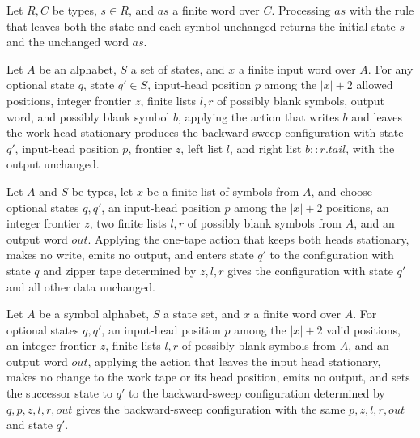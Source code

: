 \begin{lemma}
\label{Turing.FinTM.sweepFold_id}
\leanok
{}
Let $R,C$ be types, $s\in R$, and $as$ a finite word over $C$. Processing $as$ with the
rule that leaves both the state and each symbol unchanged returns the initial state $s$
and the unchanged word $as$.
\end{lemma}

\begin{lemma}
\label{Turing.FinTM.sweepRevCfg_write}
\leanok
{}
Let $A$ be an alphabet, $S$ a set of states, and $x$ a finite input word over $A$. For
any optional state $q$, state $q'\in S$, input-head position $p$ among the $|x|+2$
allowed positions, integer frontier $z$, finite lists $l,r$ of possibly blank symbols,
output word, and possibly blank symbol $b$, applying the action that writes $b$ and
leaves the work head stationary produces the backward-sweep configuration with state
$q'$, input-head position $p$, frontier $z$, left list $l$, and right list $b::r.tail$,
with the output unchanged.
\end{lemma}

\begin{lemma}
\label{Turing.FinTM.sweepCfg_stay}
\leanok
{}
Let $A$ and $S$ be types, let $x$ be a finite list of symbols from $A$, and choose
optional states $q,q'$, an input-head position $p$ among the $|x|+2$ positions, an
integer frontier $z$, two finite lists $l,r$ of possibly blank symbols from $A$, and an
output word $out$. Applying the one-tape action that keeps both heads stationary, makes
no write, emits no output, and enters state $q'$ to the configuration with state $q$ and
zipper tape determined by $z,l,r$ gives the configuration with state $q'$ and all other
data unchanged.
\end{lemma}

\begin{lemma}
\label{Turing.FinTM.sweepRevCfg_stay}
\leanok
{}
Let $A$ be a symbol alphabet, $S$ a state set, and $x$ a finite word over $A$. For
optional states $q,q'$, an input-head position $p$ among the $|x|+2$ valid positions, an
integer frontier $z$, finite lists $l,r$ of possibly blank symbols from $A$, and an
output word $out$, applying the action that leaves the input head stationary, makes no
change to the work tape or its head position, emits no output, and sets the successor
state to $q'$ to the backward-sweep configuration determined by $q,p,z,l,r,out$ gives
the backward-sweep configuration with the same $p,z,l,r,out$ and state $q'$.
\end{lemma}

